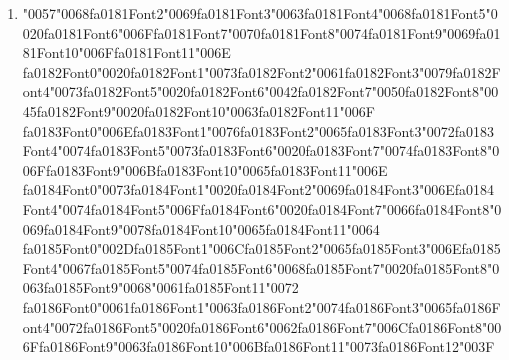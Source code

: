 \documentclass[12pt]{article}
\begin{document}
\begin{enumerate}[label=Q\arabic*.]
 \item {\char"0057}{\char"0068}{\csname fa0181Font2\endcsname\char"0069}{\csname fa0181Font3\endcsname\char"0063}{\csname fa0181Font4\endcsname\char"0068}{\csname fa0181Font5\endcsname\char"0020}{\csname fa0181Font6\endcsname\char"006F}{\csname fa0181Font7\endcsname\char"0070}{\csname fa0181Font8\endcsname\char"0074}{\csname fa0181Font9\endcsname\char"0069}{\csname fa0181Font10\endcsname\char"006F}{\csname fa0181Font11\endcsname\char"006E} {\csname fa0182Font0\endcsname\char"0020}{\csname fa0182Font1\endcsname\char"0073}{\csname fa0182Font2\endcsname\char"0061}{\csname fa0182Font3\endcsname\char"0079}{\csname fa0182Font4\endcsname\char"0073}{\csname fa0182Font5\endcsname\char"0020}{\csname fa0182Font6\endcsname\char"0042}{\csname fa0182Font7\endcsname\char"0050}{\csname fa0182Font8\endcsname\char"0045}{\csname fa0182Font9\endcsname\char"0020}{\csname fa0182Font10\endcsname\char"0063}{\csname fa0182Font11\endcsname\char"006F} {\csname fa0183Font0\endcsname\char"006E}{\csname fa0183Font1\endcsname\char"0076}{\csname fa0183Font2\endcsname\char"0065}{\csname fa0183Font3\endcsname\char"0072}{\csname fa0183Font4\endcsname\char"0074}{\csname fa0183Font5\endcsname\char"0073}{\csname fa0183Font6\endcsname\char"0020}{\csname fa0183Font7\endcsname\char"0074}{\csname fa0183Font8\endcsname\char"006F}{\csname fa0183Font9\endcsname\char"006B}{\csname fa0183Font10\endcsname\char"0065}{\csname fa0183Font11\endcsname\char"006E} {\csname fa0184Font0\endcsname\char"0073}{\csname fa0184Font1\endcsname\char"0020}{\csname fa0184Font2\endcsname\char"0069}{\csname fa0184Font3\endcsname\char"006E}{\csname fa0184Font4\endcsname\char"0074}{\csname fa0184Font5\endcsname\char"006F}{\csname fa0184Font6\endcsname\char"0020}{\csname fa0184Font7\endcsname\char"0066}{\csname fa0184Font8\endcsname\char"0069}{\csname fa0184Font9\endcsname\char"0078}{\csname fa0184Font10\endcsname\char"0065}{\csname fa0184Font11\endcsname\char"0064} {\csname fa0185Font0\endcsname\char"002D}{\csname fa0185Font1\endcsname\char"006C}{\csname fa0185Font2\endcsname\char"0065}{\csname fa0185Font3\endcsname\char"006E}{\csname fa0185Font4\endcsname\char"0067}{\csname fa0185Font5\endcsname\char"0074}{\csname fa0185Font6\endcsname\char"0068}{\csname fa0185Font7\endcsname\char"0020}{\csname fa0185Font8\endcsname\char"0063}{\csname fa0185Font9\endcsname\char"0068}{\char"0061}{\csname fa0185Font11\endcsname\char"0072} {\csname fa0186Font0\endcsname\char"0061}{\csname fa0186Font1\endcsname\char"0063}{\csname fa0186Font2\endcsname\char"0074}{\csname fa0186Font3\endcsname\char"0065}{\csname fa0186Font4\endcsname\char"0072}{\csname fa0186Font5\endcsname\char"0020}{\csname fa0186Font6\endcsname\char"0062}{\csname fa0186Font7\endcsname\char"006C}{\csname fa0186Font8\endcsname\char"006F}{\csname fa0186Font9\endcsname\char"0063}{\csname fa0186Font10\endcsname\char"006B}{\csname fa0186Font11\endcsname\char"0073}{\csname fa0186Font12\endcsname\char"003F}

\end{enumerate}
\end{document}
